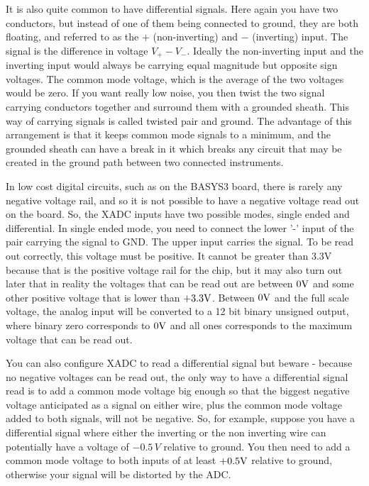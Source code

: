 \documentclass[../physical_computing.tex]{subfiles}
\begin{document}
It is also quite common to have differential signals. Here
again you have two conductors, but instead of one of them being connected to ground, they are both floating, and
referred to as the $+$ (non-inverting) and $-$ (inverting) input. The signal is the difference in voltage
$V_+-V_-$. Ideally the non-inverting input and the inverting input would always be carrying equal magnitude but 
opposite sign voltages. The common mode voltage, which is the average of the two voltages would be zero. If you 
want really low noise, you then twist the two signal carrying conductors together and surround them with a
grounded sheath. This way of carrying signals is called twisted pair and ground. The advantage of this arrangement
is that it keeps common mode signals to a minimum, and the grounded sheath can have a break in it which breaks
any circuit that may be created in the ground path between two connected instruments. 

In low cost digital circuits, such as on the BASYS3 board, there is rarely any negative voltage rail, and so 
it is not possible to have a negative voltage read out on the board. So, the XADC inputs have two possible modes,
single ended and differential. In single ended mode, you need to connect the lower '-' input of the pair carrying
the signal to GND. The upper input carries the signal. To be read out correctly, this voltage must be positive. 
It cannot be greater than 3.3V because that is the positive voltage rail for the chip, but it may also turn out
later that in reality the voltages that can be read out are between $\rm 0V$ and some other positive voltage
that is lower than $\rm +3.3V$. Between $\rm 0V$ and the full scale voltage, the analog input will be converted to a 12 bit binary unsigned output, where binary zero corresponds to $\rm 0V$ and all ones corresponds to the maximum voltage that can be read out.

You can also configure XADC to read a differential signal but beware - because no negative voltages can be read out, the only way to have a differential signal read is to add a common mode voltage big enough so that the biggest negative voltage anticipated as a signal on either wire, plus the common mode voltage added to both signals, will not be negative. So, for example, suppose you have a differential signal where either the inverting or the non inverting wire can potentially have a voltage of $-0.5\,V$ relative to ground. You then need to add a common mode voltage to both inputs of at least $\rm +0.5V$ relative to ground, otherwise your signal will be distorted by the ADC.
\end{document}
